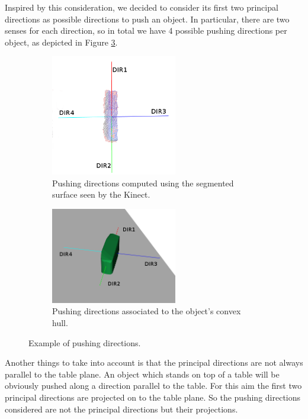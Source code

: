 Inspired by this consideration, we decided to consider its first two principal directions as possible directions to push an object. In particular, there are two senses for each direction, so in total we have 4 possible pushing directions per object, as depicted in Figure \ref{fig:directions}.

\begin{figure}
\centering
\begin{subfigure}[t]{6cm}
\includegraphics[width=5.5cm]{Img/pushing/directions.png}
\caption{Pushing directions computed using the segmented surface seen by the Kinect.}\label{fig:directions1}
\end{subfigure}
\quad
\begin{subfigure}[t]{6cm}
\includegraphics[width=5.5cm]{Img/pushing/directions2.png}
\caption{Pushing directions associated to the object's convex hull.}
\label{fig:directions2}
\end{subfigure}
\caption{Example of pushing directions.}\label{fig:directions}
\end{figure}


Another things to take into account is that the principal directions are not always parallel to the table plane. An object which stands on top of a table will be obviously pushed along a direction parallel to the table. For this aim the first two principal directions are projected on to the table plane. So the pushing directions considered are not the principal directions but their projections. 


